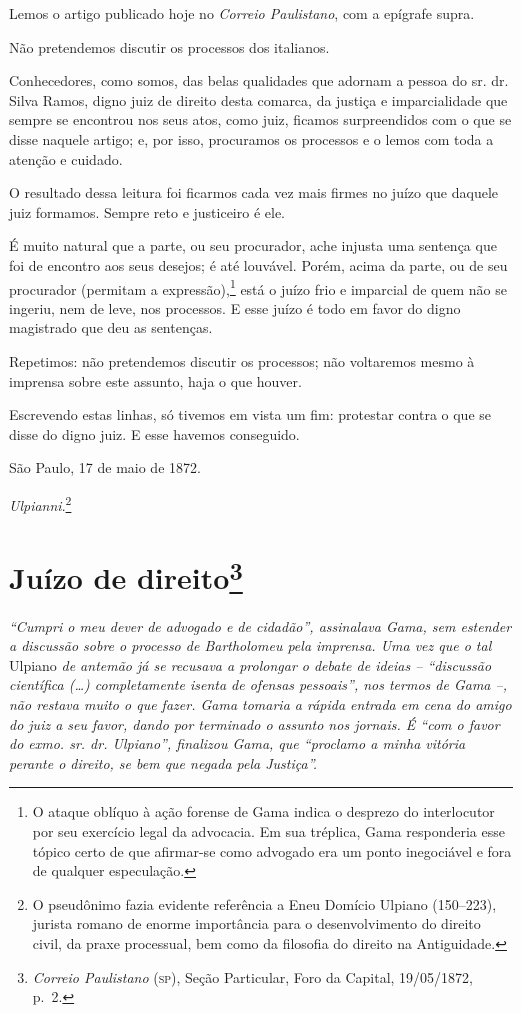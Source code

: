 {\begin{flushright}
Lemos o artigo publicado hoje no \emph{Correio Paulistano}, com a
epígrafe supra.

Não pretendemos discutir os processos dos italianos.

Conhecedores, como somos, das belas qualidades que adornam a pessoa do
sr. dr. Silva Ramos, digno juiz de direito desta comarca, da justiça e
imparcialidade que sempre se encontrou nos seus atos, como juiz, ficamos
surpreendidos com o que se disse naquele artigo; e, por isso, procuramos
os processos e o lemos com toda a atenção e cuidado.

O resultado dessa leitura foi ficarmos cada vez mais firmes no juízo que
daquele juiz formamos. Sempre reto e justiceiro é ele.

É muito natural que a parte, ou seu procurador, ache injusta uma
sentença que foi de encontro aos seus desejos; é até louvável. Porém,
acima da parte, ou de seu procurador (permitam a expressão),\footnote{
  O ataque oblíquo à ação forense de Gama indica o desprezo do
  interlocutor por seu exercício legal da advocacia. Em sua tréplica,
  Gama responderia esse tópico certo de que afirmar-se como advogado era
  um ponto inegociável e fora de qualquer especulação.} está o juízo
frio e imparcial de quem não se ingeriu, nem de leve, nos processos. E
esse juízo é todo em favor do digno magistrado que deu as sentenças.

Repetimos: não pretendemos discutir os processos; não voltaremos mesmo à
imprensa sobre este assunto, haja o que houver.

Escrevendo estas linhas, só tivemos em vista um fim: protestar contra o
que se disse do digno juiz. E esse havemos conseguido.

São Paulo, 17 de maio de 1872.

\emph{Ulpianni}.\footnote{ O pseudônimo fazia evidente referência a
  Eneu Domício Ulpiano (150--223), jurista romano de enorme importância
  para o desenvolvimento do direito civil, da praxe processual, bem como
  da filosofia do direito na Antiguidade.}

\chapter{Juízo de direito\footnote{\emph{Correio Paulistano} (\textsc{sp}), Seção Particular, Foro
  da Capital, 19/05/1872, p.~2.}} %

\begin{didascalia}
\emph{``Cumpri o meu dever de advogado e de cidadão'', assinalava Gama,
sem estender a discussão sobre o processo de Bartholomeu pela imprensa.
Uma vez que o tal} Ulpiano \emph{de antemão já se recusava a prolongar o
debate de ideias -- ``discussão científica (\ldots{}) completamente isenta de
ofensas pessoais'', nos termos de Gama --, não restava muito o que fazer.
Gama tomaria a rápida entrada em cena do amigo do juiz a seu favor,
dando por terminado o assunto nos jornais. É ``com o favor do exmo. sr.
dr. Ulpiano'', finalizou Gama, que ``proclamo a minha vitória perante o
direito, se bem que negada pela Justiça''.}
\end{didascalia}


\end{flushright}}
